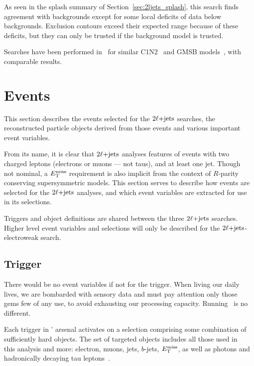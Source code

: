As seen in the splash summary of Section~\ref{sec:2ljets_splash}, this search
finds agreement with backgrounds except for some local deficits of data below
backgrounds.
Exclusion contours exceed their expected range because of these deficits,
but they can only be trusted if the background model is trusted.

Searches have been performed in \cms\ for similar
C1N2~\cite{cms_susy_2022_c1n2} and GMSB models~\cite{
cms_susy_2018_partial_run2_combination,
cms_susy_2022_gmsb
}, with comparable results.



\section{Events}
This section describes the events selected for the $2\ell\mathrm{+jets}$ searches, the
reconstructed particle objects derived from those events and various
important event variables.

From its name, it is clear that $2\ell\mathrm{+jets}$ analyses features of events with
two charged leptons (electrons or muons --- not taus), and at least one jet.
Though not nominal, a $E_\mathrm{T}^\mathrm{miss}$ requirement is also implicit from the context
of $R$-parity conserving supersymmetric models.
This section serves to describe how events are selected for the $2\ell\mathrm{+jets}$
analyses, and which event variables are extracted for use in its selections.

Triggers and object definitions are shared between the three $2\ell\mathrm{+jets}$
searches.
Higher level event variables and selections will only be described for the
$2\ell\mathrm{+jets}$-electroweak search.

\subsection{Trigger}
\label{sec:2ljets_trigger}
There would be no event variables if not for the trigger.
When living our daily lives, we are bombarded with sensory data and must pay
attention only those gems few of any use, to avoid exhausting our
processing capacity.
Running \atlas\ is no different.

Each trigger in \atlas' arsenal activates on a selection comprising some
combination of sufficiently hard objects.
The set of targeted objects includes all those used in this analysis and more:
electron, muons, jets, $b$-jets, $E_\mathrm{T}^\mathrm{miss}$, as well as photons and hadronically
decaying tau leptons~\cite{atlas_PERF_2007_01}.

